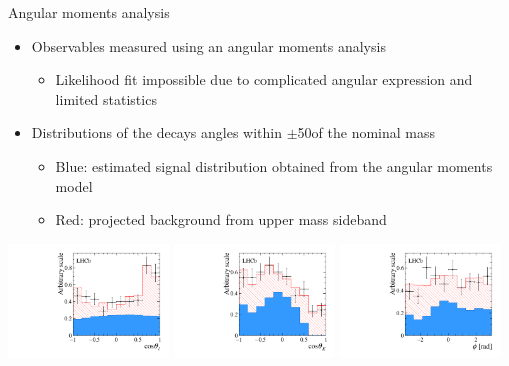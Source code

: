 \documentclass[aspectratio=1610]{beamer}
\begin{document}
\begin{frame}{Angular moments analysis}

\begin{itemize}
  \item Observables measured using an angular moments analysis
  \begin{itemize}
    \item Likelihood fit impossible due to complicated angular expression and limited statistics
  \end{itemize}
\end{itemize}

\begin{itemize}
  \item Distributions of the decays angles within $\pm$50\mevcc of the nominal \Bz mass
  \begin{itemize}
    \item Blue: estimated signal distribution obtained from the angular moments model
    \item Red: projected background from upper mass sideband
  \end{itemize}
\end{itemize}

\medskip

\centering
\includegraphics[width=0.32\textwidth]{figs/kpimm/angular-analysis/costhetal.pdf}
\includegraphics[width=0.32\textwidth]{figs/kpimm/angular-analysis/costhetak.pdf}
\includegraphics[width=0.32\textwidth]{figs/kpimm/angular-analysis/phi.pdf}

\end{frame}
\end{document}
